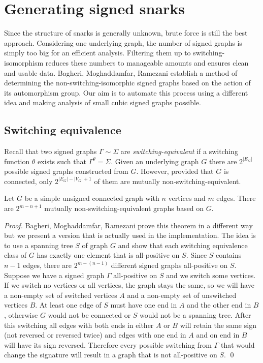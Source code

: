 \chapter{Generating signed snarks}

Since the structure of snarks is generally unknown, brute force is still the best approach. Considering one underlying graph, the number of signed graphs is simply too big for an efficient analysis. Filtering them up to switching-isomorphism reduces these numbers to manageable amounts and ensures clean and usable data. Bagheri, Moghaddamfar, Ramezani \cite{switching-isomorphic} establish a method of determining the non-switching-isomorphic signed graphs based on the action of its automorphism group. Our aim is to automate this process using a different idea and making analysis of small cubic signed graphs possible.

\section{Switching equivalence}

Recall that two signed graphs $\Gamma \sim \Sigma$ are \textit{switching-equivalent} if a switching function $\theta$ exists such that $\Gamma ^{\theta} = \Sigma$. Given an underlying graph $G$ there are $2^{|E_G|}$ possible signed graphs constructed from $G$. However, provided that $G$ is connected, only $2^{|E_G| - |V_G| + 1}$ of them are mutually non-switching-equivalent.

\begin{theorem}\label{lem1:eq-classes}
    Let $G$ be a simple unsigned connected graph with $n$ vertices and $m$ edges. There are $2^{m - n + 1}$ mutually non-switching-equivalent graphs based on $G$.
\end{theorem}

\textit{Proof.} Bagheri, Moghaddamfar, Ramezani\cite{switching-isomorphic} prove this theorem in a different way but we present a version that is actually used in the implementation. The idea is to use a spanning tree $S$ of graph $G$ and show that each switching equivalence class of $G$ has exactly one element that is all-positive on $S$. Since $S$ contains $n - 1$ edges, there are $2^{m - (n - 1)}$ different signed graphs all-positive on $S$. Suppose we have a signed graph $\Gamma$ all-positive on $S$ and we switch some vertices. If we switch no vertices or all vertices, the graph stays the same, so we will have a non-empty set of switched vertices $A$ and a non-empty set of unswitched vertices $B$. At least one edge of $S$ must have one end in $A$ and the other end in $B$, otherwise $G$ would not be connected or $S$ would not be a spanning tree. After this switching all edges with both ends in either $A$ or $B$ will retain the same sign (not reversed or reversed twice) and edges with one end in $A$ and on end in $B$ will have its sign reversed. Therefore every possible switching from $\Gamma$ that would change the signature will result in a graph that is not all-positive on $S$. \qed

